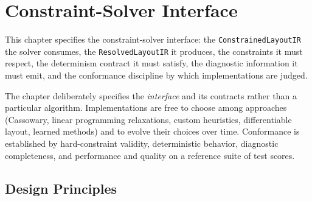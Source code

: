 \documentclass[11pt,letterpaper]{report}
\begin{document}
\chapter{Constraint-Solver Interface}
\label{ch:solver}

This chapter specifies the constraint-solver interface: the
\texttt{ConstrainedLayoutIR} the solver consumes, the
\texttt{ResolvedLayoutIR} it produces, the constraints it must
respect, the determinism contract it must satisfy, the diagnostic
information it must emit, and the conformance discipline by which
implementations are judged.

The chapter deliberately specifies the \emph{interface} and its
contracts rather than a particular algorithm. Implementations are
free to choose among approaches (Cassowary, linear programming
relaxations, custom heuristics, differentiable layout, learned
methods) and to evolve their choices over time. Conformance is
established by hard-constraint validity, deterministic behavior,
diagnostic completeness, and performance and quality on a reference
suite of test scores.

\section{Design Principles}
\label{sec:solver:principles}
\end{document}
